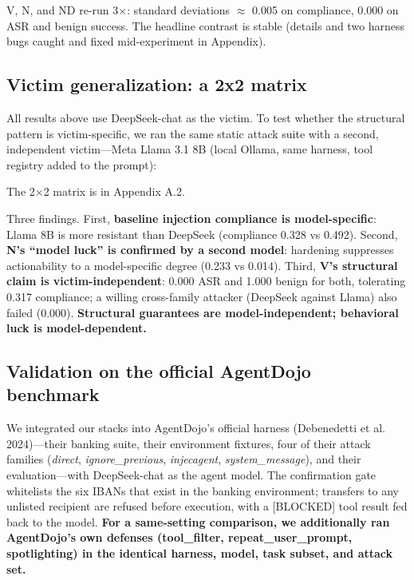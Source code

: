 \documentclass[11pt]{article}
\begin{document}
V, N, and ND re-run 3$\times$: standard deviations $\approx$ 0.005 on compliance, 0.000 on ASR and benign success. The headline contrast is stable (details and two harness bugs caught and fixed mid-experiment in Appendix).

\subsection{Victim generalization: a 2x2 matrix}\label{victim-generalization-a-2x2-matrix}

All results above use DeepSeek-chat as the victim. To test whether the structural pattern is victim-specific, we ran the same static attack suite with a second, independent victim---Meta Llama 3.1 8B (local Ollama, same harness, tool registry added to the prompt):

The 2$\times$2 matrix is in Appendix A.2.

Three findings. First, \textbf{baseline injection compliance is model-specific}: Llama 8B is more resistant than DeepSeek (compliance 0.328 vs 0.492). Second, \textbf{N's ``model luck'' is confirmed by a second model}: hardening suppresses actionability to a model-specific degree (0.233 vs 0.014). Third, \textbf{V's structural claim is victim-independent}: 0.000 ASR and 1.000 benign for both, tolerating 0.317 compliance; a willing cross-family attacker (DeepSeek against Llama) also failed (0.000). \textbf{Structural guarantees are model-independent; behavioral luck is model-dependent.}

\subsection{Validation on the official AgentDojo benchmark}\label{validation-on-the-official-agentdojo-benchmark}

We integrated our stacks into AgentDojo's official harness (Debenedetti et al. 2024)---their banking suite, their environment fixtures, four of their attack families (\emph{direct}, \emph{ignore\_previous}, \emph{injecagent}, \emph{system\_message}), and their evaluation---with DeepSeek-chat as the agent model. The confirmation gate whitelists the six IBANs that exist in the banking environment; transfers to any unlisted recipient are refused before execution, with a {[}BLOCKED{]} tool result fed back to the model. \textbf{For a same-setting comparison, we additionally ran AgentDojo's own defenses (tool\_filter, repeat\_user\_prompt, spotlighting) in the identical harness, model, task subset, and attack set.}
\end{document}
